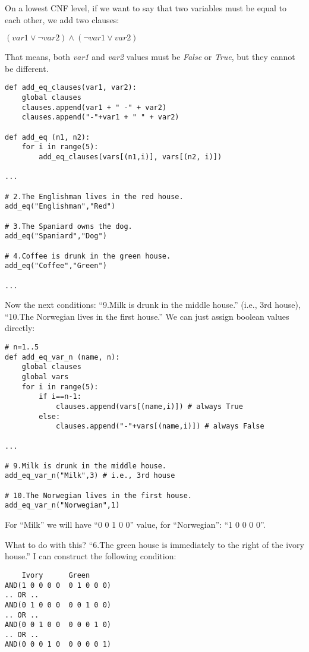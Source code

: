 On a lowest CNF level, if we want to say that two variables must be equal to each other, we add two clauses:

$(var1 \vee \neg var2) \wedge (\neg var1 \vee var2)$

That means, both \emph{var1} and \emph{var2} values must be \emph{False} or \emph{True},
but they cannot be different.

\begin{lstlisting}
def add_eq_clauses(var1, var2):
    global clauses
    clauses.append(var1 + " -" + var2)
    clauses.append("-"+var1 + " " + var2)

def add_eq (n1, n2):
    for i in range(5):
        add_eq_clauses(vars[(n1,i)], vars[(n2, i)])

...

# 2.The Englishman lives in the red house.
add_eq("Englishman","Red")

# 3.The Spaniard owns the dog.
add_eq("Spaniard","Dog")

# 4.Coffee is drunk in the green house.
add_eq("Coffee","Green")

...

\end{lstlisting}

Now the next conditions:
``9.Milk is drunk in the middle house.'' (i.e., 3rd house), ``10.The Norwegian lives in the first house.''
We can just assign boolean values directly:

\begin{lstlisting}
# n=1..5
def add_eq_var_n (name, n):
    global clauses
    global vars
    for i in range(5):
        if i==n-1:
            clauses.append(vars[(name,i)]) # always True
        else:
            clauses.append("-"+vars[(name,i)]) # always False

...

# 9.Milk is drunk in the middle house.
add_eq_var_n("Milk",3) # i.e., 3rd house

# 10.The Norwegian lives in the first house.
add_eq_var_n("Norwegian",1)
\end{lstlisting}

For ``Milk'' we will have ``0 0 1 0 0'' value, for ``Norwegian'': ``1 0 0 0 0''.

What to do with this?
``6.The green house is immediately to the right of the ivory house.''
I can construct the following condition:

\begin{lstlisting}
    Ivory      Green
AND(1 0 0 0 0  0 1 0 0 0)
.. OR ..
AND(0 1 0 0 0  0 0 1 0 0)
.. OR ..
AND(0 0 1 0 0  0 0 0 1 0)
.. OR ..
AND(0 0 0 1 0  0 0 0 0 1)
\end{lstlisting}

